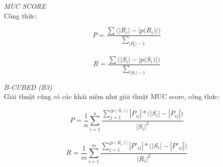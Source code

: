 \documentclass[12pt]{report}
\begin{document}
				\par \textit{MUC SCORE}
				\\Công thức:					
					\begin{center}
						\begin{equation*}
							P = \frac{\sum \big(|R_i| - |p \big(R_i)|)}{\sum_{|R_i| - 1}}
						\end{equation*}
						\\
						\begin{equation*}
							R = \frac{\sum \big(|S_i| - |p \big(S_i)|)}{\sum_{|S_i| - 1}}
						\end{equation*}												
					\end{center}

					\textit{B-CUBED (B3)}
					\\Giải thuật cũng có các khái niệm như giải thuật MUC score, công thức:
					\begin{center}
						\begin{equation*}
							P = \frac{1}{n} \sum_{i=1}^{n} \frac{\sum_{j=1}^{|p (S_i)|} |P_{ij}|*\big(|S_i| - |P_{ij}|)} {|S_{i}|^2}
						\end{equation*}
						\\
						\begin{equation*}
							R = \frac{1}{m} \sum_{i=1}^{m} \frac{\sum_{j=1}^{|p (R_i)|} |P'_{ij}|*\big(|S_i| - |P'_{ij}|)} {|R_{i}|^2}
						\end{equation*}												
					\end{center}
\end{document}
